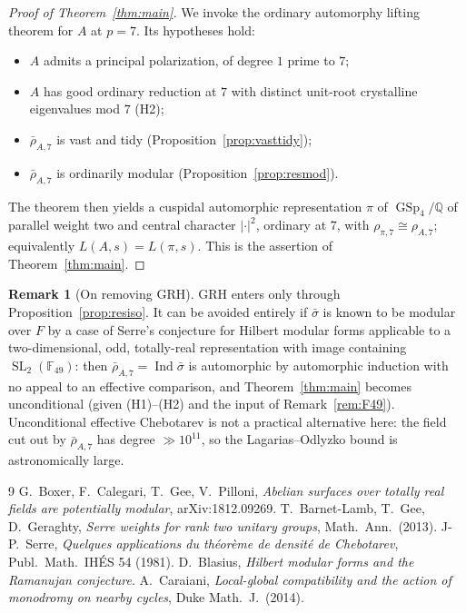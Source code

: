 \documentclass[11pt]{article}
\theoremstyle{definition}
\newtheorem{remark}{Remark}
\DeclareMathOperator{\GSp}{GSp}
\DeclareMathOperator{\SL}{SL}
\DeclareMathOperator{\Ind}{Ind}
\newcommand{\Q}{\mathbb{Q}}
\newcommand{\F}{\mathbb{F}}
\newcommand{\rbar}{\bar\rho}
\newcommand{\sbar}{\bar\sigma}
\begin{document}
\begin{proof}[Proof of Theorem~\ref{thm:main}]
We invoke the ordinary automorphy lifting theorem \cite[Prop.\ 10.1.1,
equivalently Thm.\ 1.1.7]{BCGP} for $A$ at $p=7$. Its hypotheses hold:
\begin{itemize}
\item $A$ admits a principal polarization, of degree $1$ prime to $7$;
\item $A$ has good ordinary reduction at $7$ with distinct unit-root crystalline
      eigenvalues mod $7$ (H2);
\item $\rbar_{A,7}$ is vast and tidy (Proposition~\ref{prop:vasttidy});
\item $\rbar_{A,7}$ is ordinarily modular (Proposition~\ref{prop:resmod}).
\end{itemize}
The theorem then yields a cuspidal automorphic representation $\pi$ of
$\GSp_4/\Q$ of parallel weight two and central character $|\cdot|^2$, ordinary at
$7$, with $\rho_{\pi,7}\cong\rho_{A,7}$; equivalently $L(A,s)=L(\pi,s)$. This is the
assertion of Theorem~\ref{thm:main}. \qedhere
\end{proof}

\begin{remark}[On removing GRH]
GRH enters only through Proposition~\ref{prop:resiso}. It can be avoided entirely
if $\sbar$ is known to be modular over $F$ by a case of Serre's conjecture for
Hilbert modular forms applicable to a two-dimensional, odd, totally-real
representation with image containing $\SL_2(\F_{49})$: then
$\rbar_{A,7}=\Ind\sbar$ is automorphic by automorphic induction with no appeal to
an effective comparison, and Theorem~\ref{thm:main} becomes unconditional (given
(H1)--(H2) and the input of Remark~\ref{rem:F49}). Unconditional effective
Chebotarev is not a practical alternative here: the field cut out by
$\rbar_{A,7}$ has degree $\gg 10^{11}$, so the Lagarias--Odlyzko bound is
astronomically large.
\end{remark}

\begin{thebibliography}{9}
 G.~Boxer, F.~Calegari, T.~Gee, V.~Pilloni,
  \emph{Abelian surfaces over totally real fields are potentially modular},
  arXiv:1812.09269.
 T.~Barnet-Lamb, T.~Gee, D.~Geraghty,
  \emph{Serre weights for rank two unitary groups}, Math.\ Ann.\ (2013).
 J-P.~Serre,
  \emph{Quelques applications du th\'eor\`eme de densit\'e de Chebotarev},
  Publ.\ Math.\ IH\'ES 54 (1981).
 D.~Blasius, \emph{Hilbert modular forms and the Ramanujan
  conjecture}.
 A.~Caraiani, \emph{Local-global compatibility and the action of
  monodromy on nearby cycles}, Duke Math.\ J.\ (2014).
\end{thebibliography}
\end{document}
